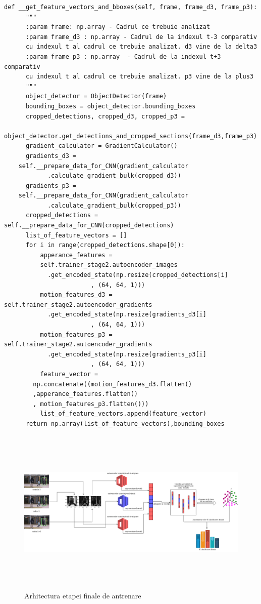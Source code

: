 \documentclass[a4paper,12pt]{report}
\begin{document}
\begin{footnotesize}
\begin{lstlisting}
def __get_feature_vectors_and_bboxes(self, frame, frame_d3, frame_p3):
      """
      :param frame: np.array - Cadrul ce trebuie analizat
      :param frame_d3 : np.array - Cadrul de la indexul t-3 comparativ 
      cu indexul t al cadrul ce trebuie analizat. d3 vine de la delta3
      :param frame_p3 : np.array  - Cadrul de la indexul t+3 comparativ 
      cu indexul t al cadrul ce trebuie analizat. p3 vine de la plus3
      """
      object_detector = ObjectDetector(frame)
      bounding_boxes = object_detector.bounding_boxes
      cropped_detections, cropped_d3, cropped_p3 = 
	object_detector.get_detections_and_cropped_sections(frame_d3,frame_p3)
      gradient_calculator = GradientCalculator()
      gradients_d3 = 
	self.__prepare_data_for_CNN(gradient_calculator
			.calculate_gradient_bulk(cropped_d3))
      gradients_p3 = 
	self.__prepare_data_for_CNN(gradient_calculator
			.calculate_gradient_bulk(cropped_p3))
      cropped_detections = self.__prepare_data_for_CNN(cropped_detections)
      list_of_feature_vectors = []
      for i in range(cropped_detections.shape[0]):
          apperance_features = 
          self.trainer_stage2.autoencoder_images
			.get_encoded_state(np.resize(cropped_detections[i]
						, (64, 64, 1)))
          motion_features_d3 = self.trainer_stage2.autoencoder_gradients
			.get_encoded_state(np.resize(gradients_d3[i]
						, (64, 64, 1)))
          motion_features_p3 = self.trainer_stage2.autoencoder_gradients
			.get_encoded_state(np.resize(gradients_p3[i]
						, (64, 64, 1)))
          feature_vector = 
		np.concatenate((motion_features_d3.flatten()
		,apperance_features.flatten()
		, motion_features_p3.flatten()))
          list_of_feature_vectors.append(feature_vector)
      return np.array(list_of_feature_vectors),bounding_boxes
\end{lstlisting}
\end{footnotesize}
\begin{figure}[h]
\begin{center}
        \includegraphics[width=1\textwidth,height=8cm]{images/training_stage2_architecture}
			 \caption{Arhitectura etapei finale de antrenare}
			 \label{fig:stage2_architecture}
\end{center}
\end{figure}
\end{document}
